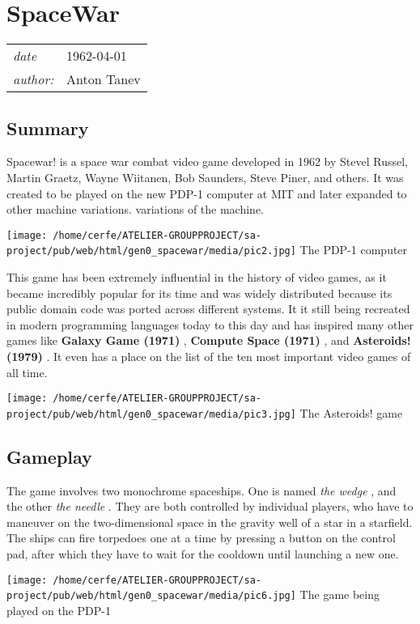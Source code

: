 \documentclass[a4paper,10pt]{book}
\newcommand{\pageHeader}[4]{
    \section{#1}
    \vspace{-0.3cm}
    \begin{table}[h!]
     \begin{tabular}{ll}
        \hline
        \textit{date} & #2 \\
        \textit{author: } & #3\\
        \hline
     \end{tabular}
    \end{table}
    \vspace{-0.3cm}
}
\begin{document}
 
 \newpage\pageHeader{SpaceWar}{1962-04-01}{Anton Tanev}{A space combat video game developed for the PDP-1 minicomputer}
 \subsection{Summary }
 
        Spacewar! is a space war combat video game developed in 1962 by Stevel Russel, Martin Graetz, Wayne Wiitanen,
        Bob Saunders, Steve Piner, and others. It was created to be played on the new PDP-1 computer at MIT and later
        expanded to other machine variations. variations of the machine. 
 
 
 
 \texttt{[image: /home/cerfe/ATELIER-GROUPPROJECT/sa-project/pub/web/html/gen0\_spacewar/media/pic2.jpg]}
 The PDP-1 computer 
 
 
 
        This game has been extremely influential in the history of video games, as it became incredibly popular for its
        time and was widely distributed because its public domain code was ported across different systems. It it still
        being recreated in modern programming languages today  to this day  and has inspired many other games like  \textbf{Galaxy Game (1971) } ,
         \textbf{Compute Space (1971) } , and  \textbf{Asteroids! (1979) } . It even has a place on the list of the ten most important video games of
        all time.
         
 
 
 \texttt{[image: /home/cerfe/ATELIER-GROUPPROJECT/sa-project/pub/web/html/gen0\_spacewar/media/pic3.jpg]}
 The Asteroids! game 
 
 
 \subsection{Gameplay }
 
        The game involves two monochrome spaceships. One is named  \textit{the wedge }, and the other  \textit{the needle }. They are
        both controlled by individual players, who have to maneuver on the two-dimensional space in the gravity well of a star
        in a starfield. The ships can fire torpedoes one at a time by pressing a button on the control pad, after which they have
        to wait for the cooldown until launching a new one.
         
 
 
 \texttt{[image: /home/cerfe/ATELIER-GROUPPROJECT/sa-project/pub/web/html/gen0\_spacewar/media/pic6.jpg]}
 The game being played on the PDP-1 
 
\end{document}
